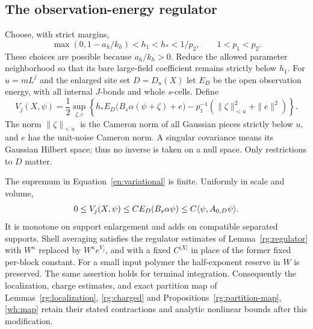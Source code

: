 \subsection{The observation-energy regulator}

Choose, with strict margins,
\begin{equation}\label{en:reserve}
 \max(0,1-a_h/k_h)<h_1<h_*<1/p_2,
              \qquad 1<p_1<p_2.
\end{equation}
These choices are possible because $a_h/k_h>0$.  Reduce the allowed
parameter neighborhood so that its bare large-field coefficient remains
strictly below $h_1$.  For $u=mL^j$ and the enlarged site set
$D=D_u(X)$ let $E_D$ be the open observation energy, with all internal
$J$-bonds and whole $s$-cells.  Define
\begin{equation}\label{en:variational}
 V_j(X,\psi)=\frac12\sup_{\zeta,e}
 \left\{h_*E_D\bigl(B_s\alpha(\psi+\zeta)+e\bigr)
       -p_1^{-1}(\|\zeta\|_{<u}^2+\|e\|^2)\right\}.
\end{equation}
The norm $\|\zeta\|_{<u}$ is the Cameron norm of all Gaussian pieces
strictly below $u$, and $e$ has the unit-noise Cameron norm.  A singular
covariance means its Gaussian Hilbert space; thus no inverse is taken
on a null space.  Only restrictions to $D$ matter.

\begin{lemma}\label{en:regulator}
The supremum in Equation~\eqref{en:variational} is finite.  Uniformly
in scale and volume,
\begin{equation}\label{en:regulator-energy}
 0\leq V_j(X,\psi)\leq CE_D(B_s\alpha\psi)
                    \leq C\langle \psi,A_{0,D}\psi\rangle.
\end{equation}
It is monotone on support enlargement and adds on compatible separated
supports.  Shell averaging satisfies the regulator estimates of
Lemma~\ref{rg:regulator} with $W^\kappa$ replaced by $W^\kappa e^{V_j}$,
and with a fixed $C^{|X|}$ in place of the former fixed per-block
constant.  For a small input polymer the half-exponent reserve in $W$
is preserved.  The same assertion holds for terminal integration.
Consequently the localization, charge estimates, and exact partition
map of Lemmas~\ref{rg:localization}, \ref{rg:charged} and
Propositions~\ref{rg:partition-map}, \ref{wh:map} retain their stated
contractions and analytic nonlinear bounds after this modification.
\end{lemma}

